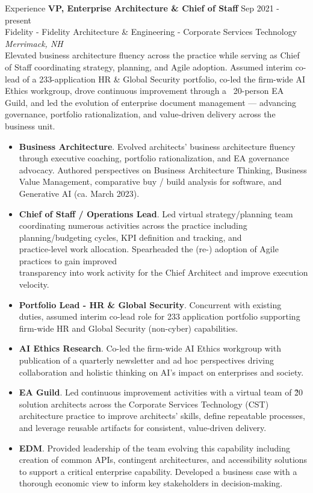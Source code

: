 \documentclass{resume} %
\begin{document}
\begin{rSection}{Experience}
\textbf{VP, Enterprise Architecture \& Chief of Staff} \hfill Sep 2021 - present\\
Fidelity - Fidelity Architecture \& Engineering - Corporate Services Technology \hfill \textit{Merrimack, NH}\\
Elevated business architecture fluency across the practice while serving as Chief of Staff coordinating strategy, planning, and Agile adoption. Assumed interim co-lead of a 233-application HR \& Global Security portfolio, co-led the firm-wide AI Ethics workgroup, drove continuous improvement through a ~20-person EA Guild, and led the evolution of enterprise document management — advancing governance, portfolio rationalization, and value-driven delivery across the business unit.

\begin{itemize}
\itemsep -3pt {}

\item \textbf{Business Architecture}. Evolved architects' business architecture fluency through executive coaching, portfolio rationalization, and EA governance advocacy. Authored perspectives on Business Architecture Thinking, Business Value Management, comparative buy / build analysis for software, and Generative AI (ca. March 2023).
\item \textbf{Chief of Staff / Operations Lead}. Led virtual strategy/planning team coordinating numerous activities across the practice including planning/budgeting cycles, KPI definition and tracking, and\\practice-level work allocation. Spearheaded the (re-) adoption of Agile practices to gain improved \\transparency into work activity for the Chief Architect and improve execution velocity.
\item \textbf{Portfolio Lead - HR \& Global Security}. Concurrent with existing duties, assumed interim co-lead role for 233 application portfolio supporting firm-wide HR and Global Security (non-cyber) capabilities. 
\item \textbf{AI Ethics Research}. Co-led the firm-wide AI Ethics workgroup with publication of a quarterly newsletter and ad hoc perspectives driving collaboration and holistic thinking on AI's impact on enterprises and society.
\item \textbf{EA Guild}. Led continuous improvement activities with a virtual team of \~20 solution architects across the Corporate Services Technology (CST) architecture practice to improve architects' skills, define repeatable processes, and leverage reusable artifacts for consistent, value-driven delivery.
\item \textbf{EDM}. Provided leadership of the team evolving this capability including creation of common APIs, contingent architectures, and accessibility solutions to support a critical enterprise capability. Developed a business case with a thorough economic view to inform key stakeholders in decision-making.
\end{itemize}


\end{rSection}
\end{document}
